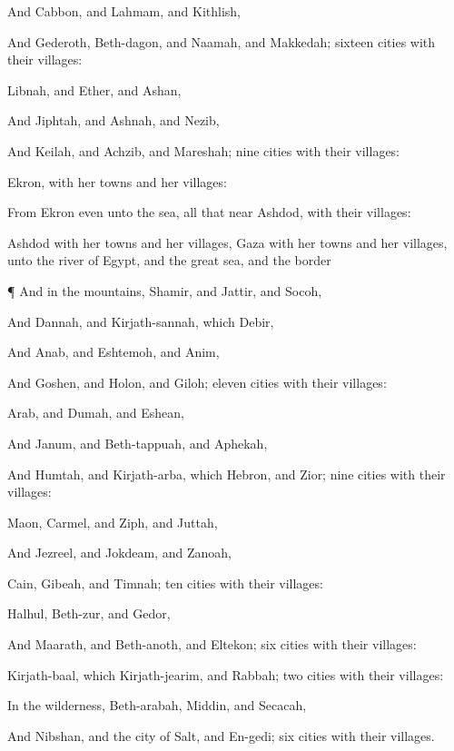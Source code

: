 {And
Cabbon, and
Lahmam, and
Kithlish,

And
Gederoth,
Beth-dagon, and
Naamah, and
Makkedah;
sixteen
cities with their
villages:

Libnah, and
Ether, and
Ashan,

And
Jiphtah, and
Ashnah, and
Nezib,

And
Keilah, and
Achzib, and
Mareshah;
nine
cities with their
villages:

Ekron, with her
towns and her
villages:

From
Ekron even unto the
sea, all that
{}
near
Ashdod, with their
villages:

Ashdod with her
towns and her
villages,
Gaza with her
towns and her
villages, unto the
river of
Egypt, and the
great
sea, and the
border
{}


\par }{\PP {}¶ And in the
mountains,
Shamir, and
Jattir, and
Socoh,

And
Dannah, and
Kirjath-sannah, which
{}
Debir,

And
Anab, and
Eshtemoh, and
Anim,

And
Goshen, and
Holon, and
Giloh;
eleven
cities with their
villages:

Arab, and
Dumah, and
Eshean,

And
Janum, and
Beth-tappuah, and
Aphekah,

And
Humtah, and
Kirjath-arba, which
{}
Hebron, and
Zior;
nine
cities with their
villages:

Maon,
Carmel, and
Ziph, and
Juttah,

And
Jezreel, and
Jokdeam, and
Zanoah,

Cain,
Gibeah, and
Timnah;
ten
cities with their
villages:

Halhul,
Beth-zur, and
Gedor,

And
Maarath, and
Beth-anoth, and
Eltekon;
six
cities with their
villages:

Kirjath-baal, which
{}
Kirjath-jearim, and
Rabbah;
two
cities with their
villages:

In the
wilderness,
Beth-arabah,
Middin, and
Secacah,

And
Nibshan, and the city of
Salt, and
En-gedi;
six
cities with their
villages.


}
